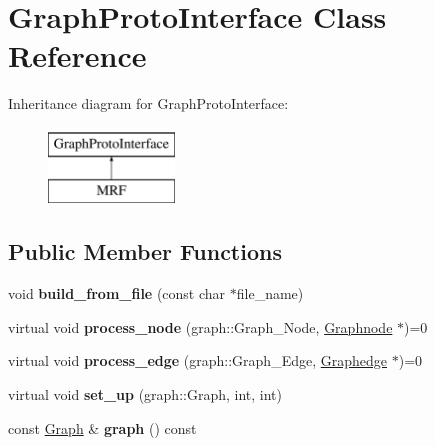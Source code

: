 \hypertarget{class_graph_proto_interface}{
\section{GraphProtoInterface Class Reference}
\label{class_graph_proto_interface}
}
Inheritance diagram for GraphProtoInterface:\begin{figure}[H]
\begin{center}
\leavevmode
\includegraphics[height=2cm]{class_graph_proto_interface}
\end{center}
\end{figure}
\subsection*{Public Member Functions}
\begin{DoxyCompactItemize}
\item 
\hypertarget{class_graph_proto_interface_a4845501ec86ea627ce484cd78162c84c}{
void {\bfseries build\_\-from\_\-file} (const char $\ast$file\_\-name)}
\label{class_graph_proto_interface_a4845501ec86ea627ce484cd78162c84c}

\item 
\hypertarget{class_graph_proto_interface_a0dbd0905dbab167b9293d0ef32409af3}{
virtual void {\bfseries process\_\-node} (graph::Graph\_\-Node, \hyperlink{class_scarab_1_1_graph_1_1_graphnode}{Graphnode} $\ast$)=0}
\label{class_graph_proto_interface_a0dbd0905dbab167b9293d0ef32409af3}

\item 
\hypertarget{class_graph_proto_interface_a3178c5f1eff8ed61d2512af8522cc550}{
virtual void {\bfseries process\_\-edge} (graph::Graph\_\-Edge, \hyperlink{class_scarab_1_1_graph_1_1_graphedge}{Graphedge} $\ast$)=0}
\label{class_graph_proto_interface_a3178c5f1eff8ed61d2512af8522cc550}

\item 
\hypertarget{class_graph_proto_interface_a8b3125379c7b2bbf832b6b955496b76e}{
virtual void {\bfseries set\_\-up} (graph::Graph, int, int)}
\label{class_graph_proto_interface_a8b3125379c7b2bbf832b6b955496b76e}

\item 
\hypertarget{class_graph_proto_interface_a920e88785192db805206c875a8a3feed}{
const \hyperlink{class_scarab_1_1_graph_1_1_graph}{Graph} \& {\bfseries graph} () const }
\label{class_graph_proto_interface_a920e88785192db805206c875a8a3feed}

\end{DoxyCompactItemize}

